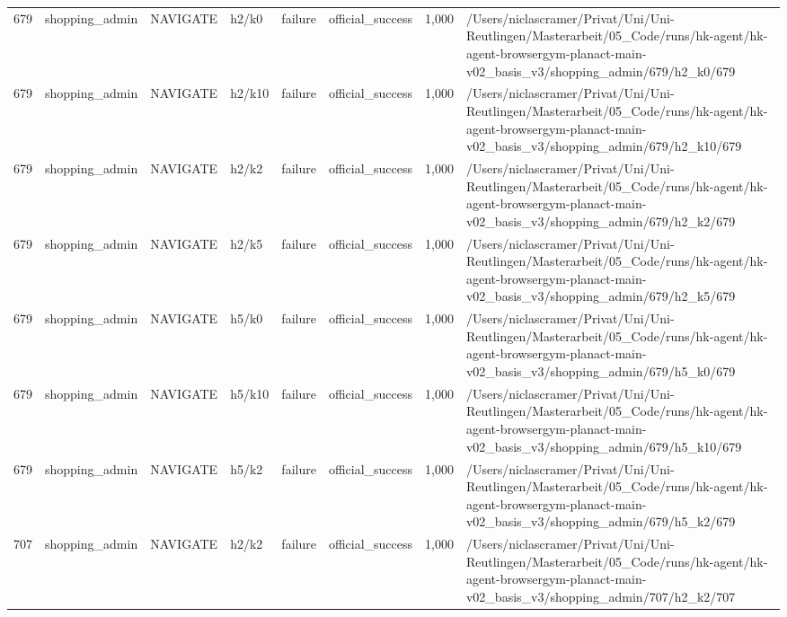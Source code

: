 \begin{longtable}{rlllllrl}
679 & shopping\_admin & NAVIGATE & h2/k0 & failure & official\_success & 1,000 & /Users/niclascramer/Privat/Uni/Uni-Reutlingen/Masterarbeit/05\_Code/runs/hk-agent/hk-agent-browsergym-planact-main-v02\_basis\_v3/shopping\_admin/679/h2\_k0/679 \\
679 & shopping\_admin & NAVIGATE & h2/k10 & failure & official\_success & 1,000 & /Users/niclascramer/Privat/Uni/Uni-Reutlingen/Masterarbeit/05\_Code/runs/hk-agent/hk-agent-browsergym-planact-main-v02\_basis\_v3/shopping\_admin/679/h2\_k10/679 \\
679 & shopping\_admin & NAVIGATE & h2/k2 & failure & official\_success & 1,000 & /Users/niclascramer/Privat/Uni/Uni-Reutlingen/Masterarbeit/05\_Code/runs/hk-agent/hk-agent-browsergym-planact-main-v02\_basis\_v3/shopping\_admin/679/h2\_k2/679 \\
679 & shopping\_admin & NAVIGATE & h2/k5 & failure & official\_success & 1,000 & /Users/niclascramer/Privat/Uni/Uni-Reutlingen/Masterarbeit/05\_Code/runs/hk-agent/hk-agent-browsergym-planact-main-v02\_basis\_v3/shopping\_admin/679/h2\_k5/679 \\
679 & shopping\_admin & NAVIGATE & h5/k0 & failure & official\_success & 1,000 & /Users/niclascramer/Privat/Uni/Uni-Reutlingen/Masterarbeit/05\_Code/runs/hk-agent/hk-agent-browsergym-planact-main-v02\_basis\_v3/shopping\_admin/679/h5\_k0/679 \\
679 & shopping\_admin & NAVIGATE & h5/k10 & failure & official\_success & 1,000 & /Users/niclascramer/Privat/Uni/Uni-Reutlingen/Masterarbeit/05\_Code/runs/hk-agent/hk-agent-browsergym-planact-main-v02\_basis\_v3/shopping\_admin/679/h5\_k10/679 \\
679 & shopping\_admin & NAVIGATE & h5/k2 & failure & official\_success & 1,000 & /Users/niclascramer/Privat/Uni/Uni-Reutlingen/Masterarbeit/05\_Code/runs/hk-agent/hk-agent-browsergym-planact-main-v02\_basis\_v3/shopping\_admin/679/h5\_k2/679 \\
707 & shopping\_admin & NAVIGATE & h2/k2 & failure & official\_success & 1,000 & /Users/niclascramer/Privat/Uni/Uni-Reutlingen/Masterarbeit/05\_Code/runs/hk-agent/hk-agent-browsergym-planact-main-v02\_basis\_v3/shopping\_admin/707/h2\_k2/707 \\
\end{longtable}
